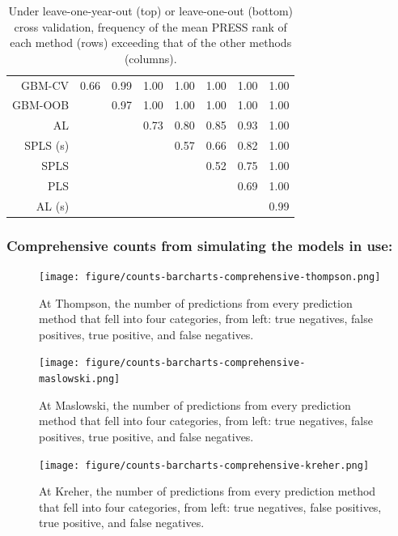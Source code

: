 \begin{table}[h!]
\begin{tabular}{rccccccc}
  \hline
GBM-CV & 0.66 & 0.99 & 1.00 & 1.00 & 1.00 & 1.00 & 1.00 \\ 
  GBM-OOB &  & 0.97 & 1.00 & 1.00 & 1.00 & 1.00 & 1.00 \\ 
  AL &  &  & 0.73 & 0.80 & 0.85 & 0.93 & 1.00 \\ 
  SPLS (s) &  &  &  & 0.57 & 0.66 & 0.82 & 1.00 \\ 
  SPLS &  &  &  &  & 0.52 & 0.75 & 1.00 \\ 
  PLS &  &  &  &  &  & 0.69 & 1.00 \\ 
  AL (s) &  &  &  &  &  &  & 0.99 \\ 
  
    \end{tabular}
    \caption{Under leave-one-year-out (top) or leave-one-out (bottom) cross validation, frequency of the mean PRESS rank of each method (rows) exceeding that of the other methods (columns).}
    \label{table:press.pairs.annual-comprehensive}
\end{table}

\subsubsection{Comprehensive counts from simulating the models in
use:}\label{comprehensive-counts-from-simulating-the-models-in-use}

\begin{figure}[htbp]
\centering
\texttt{[image: figure/counts-barcharts-comprehensive-thompson.png]}
\caption{At Thompson, the number of predictions from every prediction
method that fell into four categories, from left: true negatives, false
positives, true positive, and false negatives.}
\end{figure}

\begin{figure}[htbp]
\centering
\texttt{[image: figure/counts-barcharts-comprehensive-maslowski.png]}
\caption{At Maslowski, the number of predictions from every prediction
method that fell into four categories, from left: true negatives, false
positives, true positive, and false negatives.}
\end{figure}

\begin{figure}[htbp]
\centering
\texttt{[image: figure/counts-barcharts-comprehensive-kreher.png]}
\caption{At Kreher, the number of predictions from every prediction
method that fell into four categories, from left: true negatives, false
positives, true positive, and false negatives.}
\end{figure}

